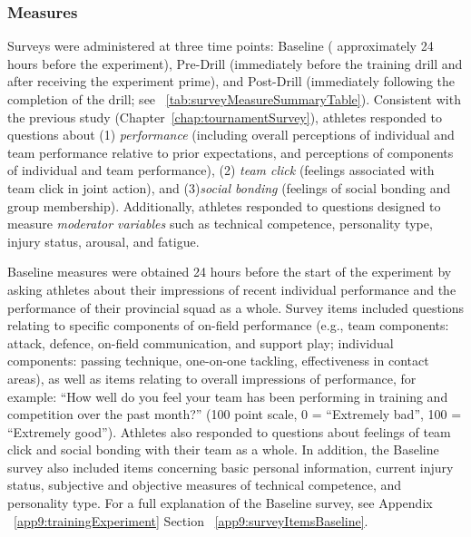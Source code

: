 \subsubsection{Measures}


    


Surveys were administered at three time points: Baseline ( approximately 24 hours before the experiment), Pre-Drill (immediately before the training drill and after receiving the experiment prime), and Post-Drill (immediately following the completion of the drill; see ~\ref{tab:surveyMeasureSummaryTable}). Consistent with the previous study (Chapter~\ref{chap:tournamentSurvey}), athletes responded to questions about (1) \textit{performance} (including overall perceptions of individual and team performance relative to prior expectations, and perceptions of components of individual and team performance), (2) \textit{team click} (feelings associated with team click in joint action), and (3)\textit{social bonding} (feelings of social bonding and group membership).  Additionally, athletes responded to questions designed to measure \textit{moderator variables} such as technical competence, personality type, injury status, arousal, and fatigue.

Baseline measures were obtained 24 hours before the start of the experiment by asking athletes about their impressions of recent individual performance and the performance of their provincial squad as a whole.  Survey items included questions relating to specific components of on-field performance (e.g., team components: attack, defence, on-field communication, and support play; individual components: passing technique, one-on-one tackling, effectiveness in contact areas), as well as items relating to overall impressions of performance, for example: ``How well do you feel your team has been performing in training and competition over the past month?'' (100 point scale, 0 = ``Extremely bad'', 100 = ``Extremely good'').  Athletes also responded to questions about feelings of team click and social bonding with their team as a whole.  In addition, the Baseline survey also included items concerning basic personal information, current injury status, subjective and objective measures of technical competence, and personality type.  For a full explanation of the Baseline survey, see Appendix ~\ref{app9:trainingExperiment} Section ~\ref{app9:surveyItemsBaseline}.


